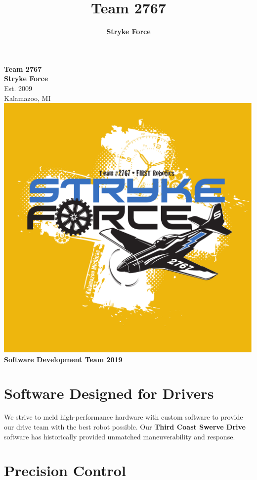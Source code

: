 \documentclass[10pt,tumble]{leaflet}
\title{Team 2767}
\author{\Large\textbf{Stryke Force}}
\begin{document}
\begin{center}
 \LARGE\textbf{Team 2767\\ Stryke Force}\\
 \Large{Est. 2009\\ Kalamazoo, MI}\\
 \vspace{0.5in}
 \includegraphics[scale=0.2]{assets/strykeforce}\\
 \vspace{0.5in}
 \LARGE\textbf{Software Development Team 2019}
 \vfill
\end{center}

\section{Software Designed for Drivers}
We strive to meld high-performance hardware with custom software to provide our drive team with the best robot possible. Our \textbf{Third Coast Swerve Drive} software has historically provided unmatched maneuverability and response.

\section{Precision Control}
\end{document}

